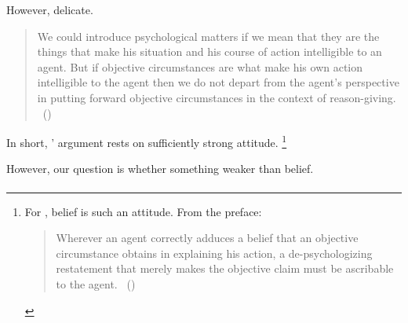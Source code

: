 \begin{note}
  However, delicate.
  \begin{quote}
    We could introduce psychological matters if we mean that they are the things that make his situation and his course of action intelligible to an agent.
    But if objective circumstances are what make his own action intelligible to the agent then we do not depart from the agent’s perspective in putting forward objective circumstances in the context of reason-giving.%
    \mbox{ }\hfill\mbox{(\citeyear[120]{Collins:1997wn})}
  \end{quote}

  In short, \citeauthor{Collins:1997wn}' argument rests on sufficiently strong attitude.%
  \footnote{
    For \citeauthor{Collins:1997wn}, belief is such an attitude.
    From the preface:
    \begin{quote}
      Wherever an agent correctly adduces a belief that an objective circumstance obtains in explaining his action, a de-psychologizing restatement that merely makes the objective claim must be ascribable to the agent.%
      \mbox{ }\hfill\mbox{(\citeyear[120]{Collins:1997wn})}
    \end{quote}
  }

  However, our question is whether something weaker than belief.
\end{note}

\paragraph{}


